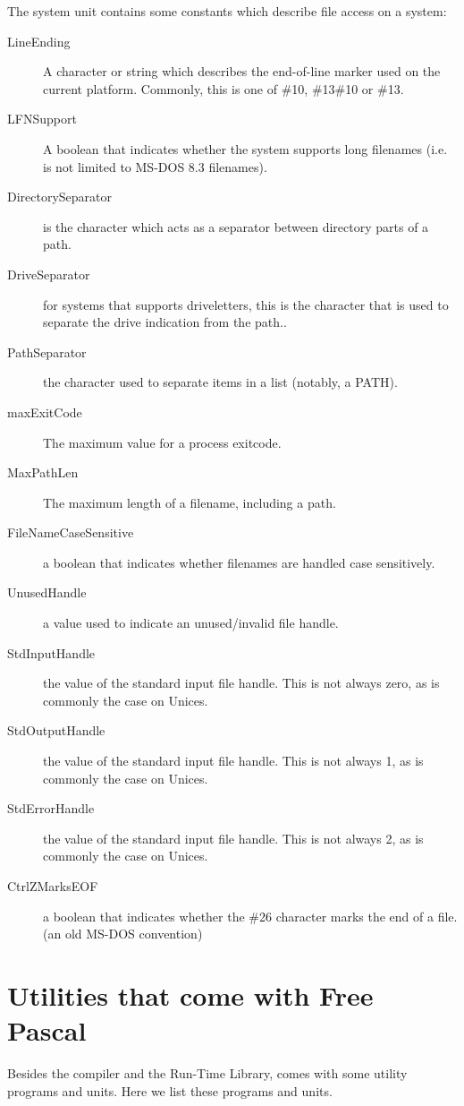 The system unit contains some constants which describe file access on a system:
\begin{description}
\item[LineEnding] A character or string which describes the end-of-line marker used on the current platform. Commonly, this is one of \#10, \#13\#10 or \#13.
\item[LFNSupport] A boolean that indicates whether the system supports long filenames
(i.e. is not limited to MS-DOS 8.3 filenames).
\item[DirectorySeparator] is the character which acts as a separator between directory parts of a path.
\item[DriveSeparator] for systems that supports driveletters, this is the character that
is used to separate the drive indication from the path..
\item[PathSeparator] the character used to separate items in a list (notably, a PATH).
\item[maxExitCode] The maximum value for a process exitcode.
\item[MaxPathLen] The maximum length of a filename, including a path.
\item[FileNameCaseSensitive] a boolean that indicates whether filenames are handled case sensitively.
\item[UnusedHandle] a value used to indicate an unused/invalid file handle.
\item[StdInputHandle] the value of the standard input file handle. This is not always zero, as is commonly the case on Unices.
\item[StdOutputHandle] the value of the standard input file handle. This is not always 1, as is commonly the case on Unices.
\item[StdErrorHandle] the value of the standard input file handle. This is not always 2, as is commonly the case on Unices.
\item[CtrlZMarksEOF] a boolean that indicates whether the \#26 character marks the end of a file.
(an old MS-DOS convention)
\end{description}


\chapter{Utilities that come with Free Pascal}
\label{ch:Utilities}
Besides the compiler and the Run-Time Library, \fpc comes with some utility
programs and units. Here we list these programs and units.

